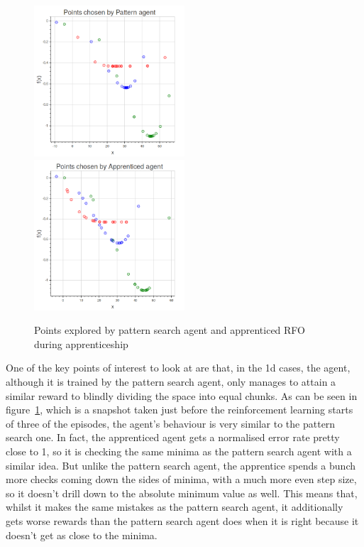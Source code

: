 \begin{figure}
\includegraphics[width = 0.5\textwidth]{pictures/tutorbehav.png} 
\includegraphics[width = 0.5\textwidth]{pictures/pupilbehav.png}
\caption{Points explored by pattern search agent and apprenticed RFO during apprenticeship}
\label{fig:appbehav}
\end{figure}
One of the key points of interest to look at are that, in the 1d cases, the agent, although it is trained by the pattern search agent, only manages to attain a similar reward to blindly dividing the space into equal chunks. As can be seen in figure~\ref{fig:appbehav}, which is a snapshot taken just before the reinforcement learning starts of three of the episodes, the agent's behaviour is very similar to the pattern search one. In fact, the apprenticed agent gets a normalised error rate pretty close to 1, so it is checking the same minima as the pattern search agent with a similar idea. But unlike the pattern search agent, the apprentice spends a bunch more checks coming down the sides of minima, with a much more even step size, so it doesn't drill down to the absolute minimum value as well. This means that, whilst it makes the same mistakes as the pattern search agent, it additionally gets worse rewards than the pattern search agent does when it is right because it doesn't get as close to the minima. 


